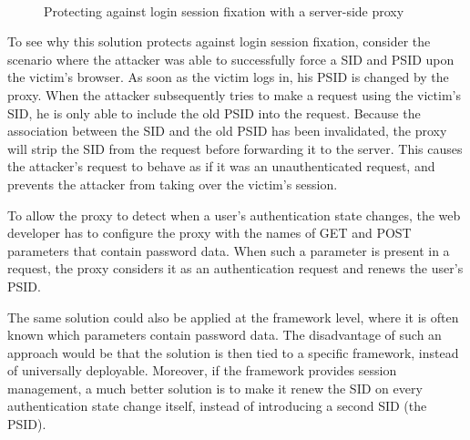 \begin{figure}[htb]
	\centering
	\\
	\caption[Protecting against login session fixation with a server-side proxy]{\label{fig:johnsfixation}Protecting against login session fixation with a server-side proxy \cite{Johns2011}}
\end{figure}

To see why this solution protects against login session fixation, consider the scenario where the attacker was able to successfully force a SID and PSID upon the victim's browser. As soon as the victim logs in, his PSID is changed by the proxy. When the attacker subsequently tries to make a request using the victim's SID, he is only able to include the old PSID into the request. Because the association between the SID and the old PSID has been invalidated, the proxy will strip the SID from the request before forwarding it to the server. This causes the attacker's request to behave as if it was an unauthenticated request, and prevents the attacker from taking over the victim's session.

To allow the proxy to detect when a user's authentication state changes, the web developer has to configure the proxy with the names of GET and POST parameters that contain password data. When such a parameter is present in a request, the proxy considers it as an authentication request and renews the user's PSID.

The same solution could also be applied at the framework level, where it is often known which parameters contain password data. The disadvantage of such an approach would be that the solution is then tied to a specific framework, instead of universally deployable. Moreover, if the framework provides session management, a much better solution is to make it renew the SID on every authentication state change itself, instead of introducing a second SID (the PSID).

